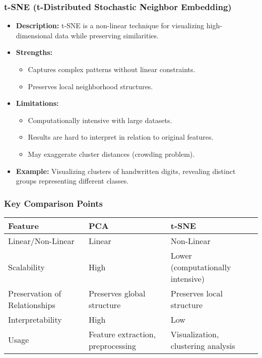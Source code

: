 \documentclass[aspectratio=169]{beamer}
\begin{document}
\begin{frame}[fragile]
    \frametitle{t-SNE (t-Distributed Stochastic Neighbor Embedding)}
    
    \begin{itemize}
        \item \textbf{Description:} 
            t-SNE is a non-linear technique for visualizing high-dimensional data while preserving similarities.
        
        \item \textbf{Strengths:}
            \begin{itemize}
                \item Captures complex patterns without linear constraints.
                \item Preserves local neighborhood structures.
            \end{itemize}
        
        \item \textbf{Limitations:}
            \begin{itemize}
                \item Computationally intensive with large datasets.
                \item Results are hard to interpret in relation to original features.
                \item May exaggerate cluster distances (crowding problem).
            \end{itemize}
        
        \item \textbf{Example:} 
            Visualizing clusters of handwritten digits, revealing distinct groups representing different classes.
    \end{itemize}
\end{frame}

\begin{frame}[fragile]
    \frametitle{Key Comparison Points}
    
    \begin{tabular}{|l|l|l|}
        \hline
        \textbf{Feature} & \textbf{PCA} & \textbf{t-SNE} \\ \hline
        Linear/Non-Linear & Linear & Non-Linear \\ \hline
        Scalability & High & Lower (computationally intensive) \\ \hline
        Preservation of Relationships & Preserves global structure & Preserves local structure \\ \hline
        Interpretability & High & Low \\ \hline
        Usage & Feature extraction, preprocessing & Visualization, clustering analysis \\ \hline
    \end{tabular}
\end{frame}
\end{document}
